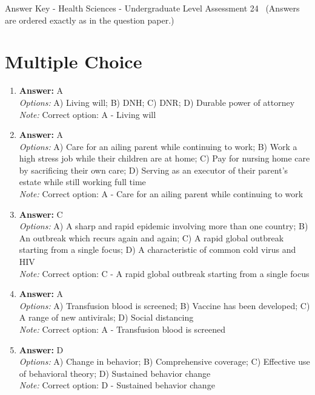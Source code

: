 \documentclass[12pt]{article}
\begin{document}
\begin{center}
Answer Key - Health Sciences - Undergraduate Level Assessment 24 \
\small (Answers are ordered exactly as in the question paper.)
\end{center}

\section*{Multiple Choice}
\begin{enumerate}[label=\arabic*.]
\item \textbf{Answer:} A
\\ \textit{Options:} A) Living will; B) DNH; C) DNR; D) Durable power of attorney
\\ \textit{Note:} Correct option: A - Living will
\item \textbf{Answer:} A
\\ \textit{Options:} A) Care for an ailing parent while continuing to work; B) Work a high stress job while their children are at home; C) Pay for nursing home care by sacrificing their own care; D) Serving as an executor of their parent's estate while still working full time
\\ \textit{Note:} Correct option: A - Care for an ailing parent while continuing to work
\item \textbf{Answer:} C
\\ \textit{Options:} A) A sharp and rapid epidemic involving more than one country; B) An outbreak which recurs again and again; C) A rapid global outbreak starting from a single focus; D) A characteristic of common cold virus and HIV
\\ \textit{Note:} Correct option: C - A rapid global outbreak starting from a single focus
\item \textbf{Answer:} A
\\ \textit{Options:} A) Transfusion blood is screened; B) Vaccine has been developed; C) A range of new antivirals; D) Social distancing
\\ \textit{Note:} Correct option: A - Transfusion blood is screened
\item \textbf{Answer:} D
\\ \textit{Options:} A) Change in behavior; B) Comprehensive coverage; C) Effective use of behavioral theory; D) Sustained behavior change
\\ \textit{Note:} Correct option: D - Sustained behavior change
\end{enumerate}
\end{document}
